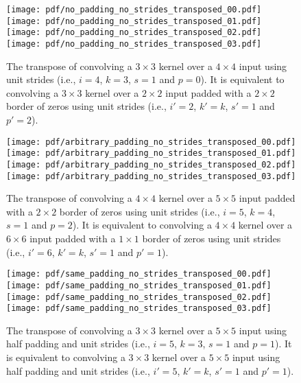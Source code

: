 \documentclass[notitlepage]{report}
\begin{document}
\begin{figure}[p]
    \centering
    \texttt{[image: pdf/no\_padding\_no\_strides\_transposed\_00.pdf]}
    \texttt{[image: pdf/no\_padding\_no\_strides\_transposed\_01.pdf]}
    \texttt{[image: pdf/no\_padding\_no\_strides\_transposed\_02.pdf]}
    \texttt{[image: pdf/no\_padding\_no\_strides\_transposed\_03.pdf]}
    \caption{\label{fig:no_padding_no_strides_transposed} The transpose of
        convolving a $3 \times 3$ kernel over a $4 \times 4$ input using unit
        strides (i.e., $i = 4$, $k = 3$, $s = 1$ and $p = 0$). It is equivalent
        to convolving a $3 \times 3$ kernel over a $2 \times 2$ input padded
        with a $2 \times 2$ border of zeros using unit strides (i.e., $i' = 2$,
        $k' = k$, $s' = 1$ and $p' = 2$).}
\end{figure}

\begin{figure}[p]
    \centering
    \texttt{[image: pdf/arbitrary\_padding\_no\_strides\_transposed\_00.pdf]}
    \texttt{[image: pdf/arbitrary\_padding\_no\_strides\_transposed\_01.pdf]}
    \texttt{[image: pdf/arbitrary\_padding\_no\_strides\_transposed\_02.pdf]}
    \texttt{[image: pdf/arbitrary\_padding\_no\_strides\_transposed\_03.pdf]}
    \caption{\label{fig:arbitrary_padding_no_strides_transposed} The transpose
        of convolving a $4 \times 4$ kernel over a $5 \times 5$ input padded
        with a $2 \times 2$ border of zeros using unit strides (i.e., $i = 5$,
        $k = 4$, $s = 1$ and $p = 2$). It is equivalent to convolving a $4
        \times 4$ kernel over a $6 \times 6$ input padded with a $1 \times 1$
        border of zeros using unit strides (i.e., $i' = 6$, $k' = k$, $s' = 1$
        and $p' = 1$).}
\end{figure}

\begin{figure}[p]
    \centering
    \texttt{[image: pdf/same\_padding\_no\_strides\_transposed\_00.pdf]}
    \texttt{[image: pdf/same\_padding\_no\_strides\_transposed\_01.pdf]}
    \texttt{[image: pdf/same\_padding\_no\_strides\_transposed\_02.pdf]}
    \texttt{[image: pdf/same\_padding\_no\_strides\_transposed\_03.pdf]}
    \caption{\label{fig:same_padding_no_strides_transposed} The transpose of
        convolving a $3 \times 3$ kernel over a $5 \times 5$ input using half
        padding and unit strides (i.e., $i = 5$, $k = 3$, $s = 1$ and $p = 1$).
        It is equivalent to convolving a $3 \times 3$ kernel over a $5 \times 5$
        input using half padding and unit strides (i.e., $i' = 5$, $k' = k$, $s'
        = 1$ and $p' = 1$).}
\end{figure}
\end{document}
